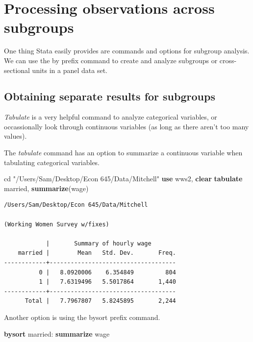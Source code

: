 \documentclass[
]{book}
\newenvironment{Shaded}{\begin{snugshade}}{\end{snugshade}}
\newcommand{\KeywordTok}[1]{\textcolor[rgb]{0.13,0.29,0.53}{\textbf{#1}}}
\newcommand{\NormalTok}[1]{#1}
\newcommand{\StringTok}[1]{\textcolor[rgb]{0.31,0.60,0.02}{#1}}
\begin{document}
\chapter{Processing observations across subgroups}\label{processing-observations-across-subgroups}

One thing Stata easily provides are commands and options for subgroup
analysis. We can use the by prefix command to create and analyze subgroups
or cross-sectional units in a panel data set.

\section{Obtaining separate results for subgroups}\label{obtaining-separate-results-for-subgroups}

\emph{Tabulate} is a very helpful command to analyze categorical variables, or occassionally look through continuous variables (as long as there aren't too many values).

The \emph{tabulate} command has an option to summarize a continuous variable when tabulating categorical variables.

\begin{Shaded}
\begin{Highlighting}[]
\NormalTok{cd }\StringTok{"/Users/Sam/Desktop/Econ 645/Data/Mitchell"}
\KeywordTok{use}\NormalTok{ wws2, }\KeywordTok{clear}
\KeywordTok{tabulate}\NormalTok{ married, }\KeywordTok{summarize}\NormalTok{(wage)}
\end{Highlighting}
\end{Shaded}

\begin{verbatim}
/Users/Sam/Desktop/Econ 645/Data/Mitchell

(Working Women Survey w/fixes)

            |       Summary of hourly wage
    married |        Mean   Std. Dev.       Freq.
------------+------------------------------------
          0 |   8.0920006    6.354849         804
          1 |   7.6319496   5.5017864       1,440
------------+------------------------------------
      Total |   7.7967807   5.8245895       2,244
\end{verbatim}

Another option is using the bysort prefix command.

\begin{Shaded}
\begin{Highlighting}[]
\KeywordTok{bysort}\NormalTok{ married: }\KeywordTok{summarize}\NormalTok{ wage}
\end{Highlighting}
\end{Shaded}
\end{document}
